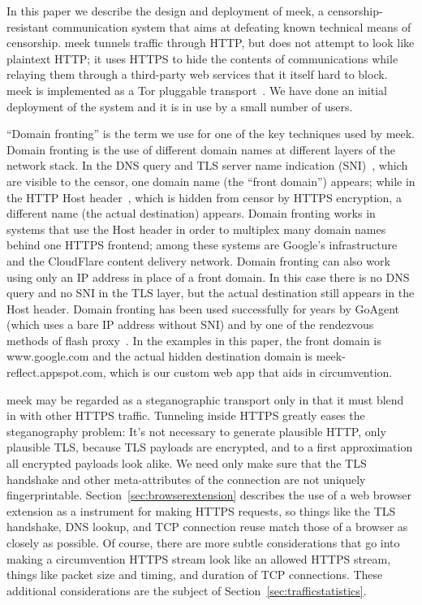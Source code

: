 \documentclass{article}
\begin{document}
In this paper we describe the design and deployment of meek,
a censorship-resistant communication system that aims at defeating
known technical means of censorship.
meek tunnels traffic through HTTP, but does not attempt to look like plaintext HTTP;
it uses HTTPS to hide the contents of communications
while relaying them through a third-party web services that it itself hard to block.
meek is implemented as a Tor pluggable transport~\cite{pt}.
We have done an initial deployment of the system and it is in use
by a small number of users.

``Domain fronting'' is the term we use for one of the key techniques used by meek.
Domain fronting is the use of different domain names at different layers of the network stack.
In the DNS query and TLS server name indication (SNI)~\cite[Section~3]{rfc6066},
which are visible to the censor, one domain name (the ``front domain'') appears;
while in the HTTP Host header~\cite[Section~14.23]{rfc2616},
which is hidden from censor by HTTPS encryption,
a different name (the actual destination) appears.
Domain fronting works in systems that use the Host header in order to
multiplex many domain names behind one HTTPS frontend;
among these systems are Google's infrastructure and the
CloudFlare content delivery network.
Domain fronting can also work using only an IP address in place of
a front domain. In this case there is no DNS query and no SNI in the TLS layer,
but the actual destination still appears in the Host header.
Domain fronting has been used successfully for years by GoAgent~\cite{goagent}
(which uses a bare IP address without SNI)
and by one of the rendezvous methods of flash proxy~\cite{flashproxy}.
In the examples in this paper, the front domain is www.google.com
and the actual hidden destination domain is meek-reflect.appspot.com,
which is our custom web app that aids in circumvention.

meek may be regarded as a steganographic transport only in that it must blend in with other HTTPS traffic.
Tunneling inside HTTPS greatly eases the steganography problem:
It's not necessary to generate plausible HTTP, only plausible TLS,
because TLS payloads are encrypted, and to a first approximation all encrypted payloads look alike.
We need only make sure that the TLS handshake and other meta-attributes of the connection are not uniquely fingerprintable.
Section~\ref{sec:browserextension} describes the use of a web browser extension as a instrument for making HTTPS requests,
so things like the TLS handshake, DNS lookup, and TCP connection reuse match those of a browser as closely as possible.
Of course, there are more subtle considerations that go into
making a circumvention HTTPS stream look like an allowed HTTPS stream,
things like packet size and timing, and duration of TCP connections.
These additional considerations are the subject of Section~\ref{sec:trafficstatistics}.
\end{document}
